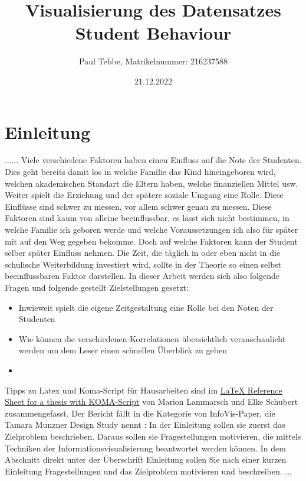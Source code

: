 \documentclass[usegeometry=true]{scrartcl}
\begin{document}
\subject{Projektbericht zum Modul Information Retrieval und Visualisierung Sommersemester 2022}
\title{Visualisierung des Datensatzes Student Behaviour}
\author{Paul Tebbe, Matrikelnummer: 216237588}%
\date{21.12.2022}
\maketitle%

\section{Einleitung}
\label{Einleitung}
......
Viele verschiedene Faktoren haben einen Einfluss auf die Note der Studenten. Dies geht bereits damit los in welche Familie das Kind hineingeboren wird, welchen akademischen Standart die Eltern haben, welche finanziellen Mittel usw. Weiter spielt die Erziehung und der spätere soziale Umgang eine Rolle. \cite{Earthman}
Diese Einflüsse sind schwer zu messen, vor allem schwer genau zu messen. Diese Faktoren sind kaum von alleine beeinflussbar, es lässt sich nicht bestimmen, in welche Familie ich geboren werde und welche Voraussetzungen ich also für später mit auf den Weg gegeben bekomme. Doch auf welche Faktoren kann der Student selber später Einfluss nehmen. Die Zeit, die täglich in oder eben nicht in die schulische Weiterbildung investiert wird, sollte in der Theorie so einen selbst beeinflussbaren Faktor darstellen. 
In dieser Arbeit werden sich also folgende Fragen und folgende gestellt Zielstellungen gesetzt:

\begin{itemize}
\item Inwieweit spielt die eigene Zeitgestaltung eine Rolle bei den Noten der Studenten
\item Wie können die verschiedenen Korrelationen übersichtlich veranschaulicht werden um dem Leser einen schnellen Überblick zu geben
\item 
\end{itemize}



Tipps zu Latex und Koma-Script für Hausarbeiten sind im \href{http://mirrors.ctan.org/info/latex-refsheet/LaTeX_RefSheet.pdf}{LaTeX Reference Sheet for a thesis with KOMA-Script} von Marion Lammarsch und Elke Schubert zusammengefasst. 
Der Bericht fällt in die Kategorie von InfoVis-Paper, die Tamara Munzner Design Study nennt \cite{Munzner2008}: In der Einleitung sollen sie zuerst das Zielproblem beschrieben. Daraus sollen sie Fragestellungen motivieren, die mittels Techniken der Informationsvisualisierung beantwortet werden können. In dem Abschnitt direkt unter der Überschrift Einleitung sollen Sie nach einer kurzen Einleitung Fragestellungen und das Zielproblem motivieren und beschreiben. ...
\end{document}
